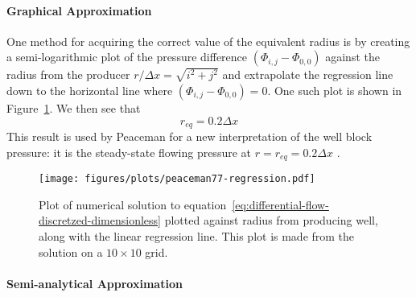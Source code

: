 \paragraph{Graphical Approximation} %
\label{par:graphical_approximation}
One method for acquiring the correct value of the equivalent radius is by creating a semi-logarithmic plot of the pressure difference $(\Phi_{i,j}-\Phi_{0,0})$ against the radius from the producer $r/\Delta x=\sqrt{i^2+j^2}$ and extrapolate the regression line down to the horizontal line where $(\Phi_{i,j}-\Phi_{0,0})=0$. One such plot is shown in Figure~\ref{fig:peaceman77_pressure_vs_radius}. We then see that
\begin{equation}
    r_{eq} = 0.2 \Delta x
\end{equation}
This result is used by Peaceman for a new interpretation of the well block pressure: it is the steady-state flowing pressure at $r=r_{eq}=0.2 \Delta x$ \cite{Peaceman1978Interpretation}.

\begin{figure}[htb]
    \centering
    \texttt{[image: figures/plots/peaceman77-regression.pdf]}
    \caption{Plot of numerical solution to equation~\eqref{eq:differential-flow-discretzed-dimensionless} plotted against radius from producing well, along with the linear regression line. This plot is made from the solution on a $10\times 10$ grid.}
    \label{fig:peaceman77_pressure_vs_radius}
\end{figure}

\paragraph{Semi-analytical Approximation} %
\label{par:semi_analytical_approximation}


